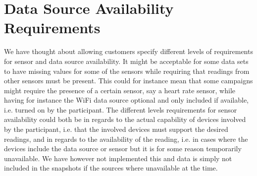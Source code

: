 
\section{Data Source Availability Requirements}

We have thought about allowing customers specify different levels of requirements for sensor and data source availability. It might be acceptable for some data sets to have missing values for some of the sensors while requiring that readings from other sensors must be present. This could for instance mean that some campaigns might require the presence of a certain sensor, say a heart rate sensor, while having for instance the WiFi data source optional and only included if available, i.e. turned on by the participant. The different levels requirements for sensor availability could both be in regards to the actual capability of devices involved by the participant, i.e. that the involved devices must support the desired readings, and in regards to the availability of the reading, i.e. in cases where the devices include the data source or sensor but it is for some reason temporarily unavailable. We have however not implemented this and data is simply not included in the snapshots if the sources where unavailable at the time.
